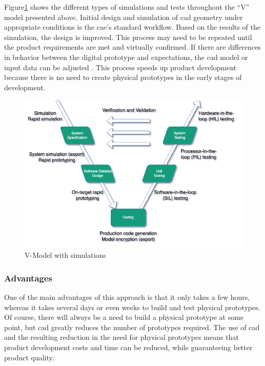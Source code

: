     Figure\ref{fig:v-model-sim} shows the different types of simulations and tests throughout the “V” model presented above. Initial design and simulation of \acrfull{cad} geometry under appropriate conditions is the \acrshort{cae}'s standard workflow. Based on the results of the simulation, the design is improved. This process may need to be repeated until the product requirements are met and virtually confirmed. If there are differences in behavior between the digital prototype and expectations, the \acrshort{cad} model or input data can be adjusted \cite{sellgren1999simulation, jeon2016automatic}. This process speeds up product development because there is no need to create physical prototypes in the early stages of development.

    \begin{figure}[h]
        \centering
        \includegraphics[scale=0.6]{images/Foundation-V-Model-Sim.drawio.png}
        \caption{\label{fig:v-model-sim} V-Model with simulations \cite{validVerifSys} }
    \end{figure}


    \subsubsection{Advantages}
    One of the main advantages of this approach is that it only takes a few hours, whereas it takes several days or even weeks to build and test physical prototypes. Of course, there will always be a need to build a physical prototype at some point, but \acrshort{cad} greatly reduces the number of prototypes required. The use of \acrshort{cad} and the resulting reduction in the need for physical prototypes means that product development costs and time can be reduced, while guaranteeing better product quality.\\

